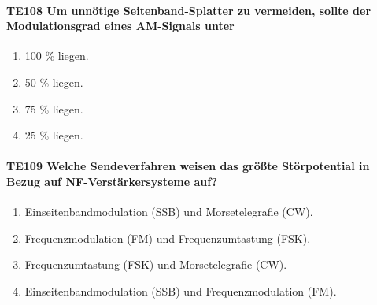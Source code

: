 \documentclass[8pt]{article}
\begin{document}
\begin{enumerate}
\begin{enumerate}[nolistsep,label=\Alph*]
\paragraph*{TE108 Um unnötige Seitenband-Splatter zu vermeiden, sollte der Modulationsgrad eines AM-Signals unter}
\begin{enumerate}[nolistsep,label=\Alph*]
\item 100 \% liegen.
\item 50 \% liegen.
\item 75 \% liegen.
\item 25 \% liegen.
\end{enumerate}

\paragraph*{TE109 Welche Sendeverfahren weisen das größte Störpotential in Bezug auf NF-Verstärkersysteme auf?}
\begin{enumerate}[nolistsep,label=\Alph*]
\item Einseitenbandmodulation (SSB) und Morsetelegrafie (CW).
\item Frequenzmodulation (FM) und Frequenzumtastung (FSK).
\item Frequenzumtastung (FSK) und Morsetelegrafie (CW).
\item Einseitenbandmodulation (SSB) und Frequenzmodulation (FM).
\end{enumerate}


\end{enumerate}
\end{enumerate}
\end{document}

